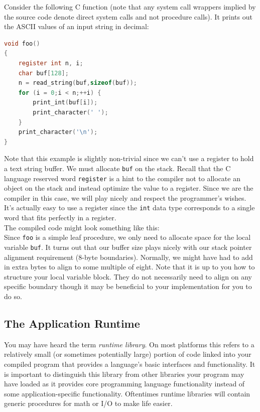 \documentclass[12pt]{article}
\begin{document}
Consider the following C function (note that any system call wrappers implied by
     the source code denote direct system calls and not procedure calls). It
     prints out the ASCII values of an input string in decimal:\\

\begin{lstlisting}[language=C]
void foo()
{
    register int n, i;
    char buf[128];
    n = read_string(buf,sizeof(buf));
    for (i = 0;i < n;++i) {
        print_int(buf[i]);
        print_character(' ');
    }
    print_character('\n');
}
\end{lstlisting}

Note that this example is slightly non-trivial since we can't use a register to
     hold a text string buffer. We must allocate \texttt{buf} on the
     stack. Recall that the C language reserved word \texttt{register} is a hint
     to the compiler not to allocate an object on the stack and instead optimize
     the value to a register. Since we are the compiler in this case, we will
     play nicely and respect the programmer's wishes. It's actually easy to use
     a register since the \texttt{int} data type corresponds to a single word
     that fits perfectly in a register.\\

\newpage
The compiled code might look something like this:\\



Since \texttt{foo} is a simple leaf procedure, we only need to allocate space
     for the local variable \texttt{buf}. It turns out that our buffer size
     plays nicely with our stack pointer alignment requirement (8-byte
     boundaries). Normally, we might have had to add in extra bytes to align to
     some multiple of eight. Note that it is up to you how to structure your
     local variable block. They do not necessarily need to align on any specific
     boundary though it may be beneficial to your implementation for you to do
     so.

\subsection{The Application Runtime}
\label{sec:runtime}

You may have heard the term \textit{runtime library}. On most platforms this
     refers to a relatively small (or sometimes potentially large) portion of
     code linked into your compiled program that provides a language's basic
     interfaces and functionality. It is important to distinguish this library
     from other libraries your program may have loaded as it provides core
     programming language functionality instead of some application-specific
     functionality. Oftentimes runtime libraries will contain generic procedures
     for math or I/O to make life easier.\\
\end{document}
